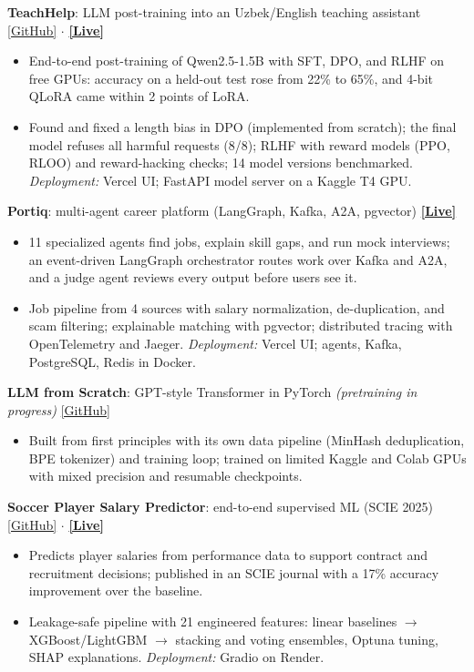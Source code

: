 \documentclass[10pt,a4paper]{article}
\newcommand{\group}[1]{\vspace{2pt}{\normalsize\bfseries\itshape #1}\par\vspace{2pt}}
\begin{document}
\textbf{TeachHelp}: LLM post-training into an Uzbek/English teaching assistant \hfill \href{https://github.com/davronbek-malikov/Post_Training}{[GitHub]} $\cdot$ \href{https://teach-help.vercel.app}{\textbf{[Live]}}
\begin{itemize}
    \item End-to-end post-training of Qwen2.5-1.5B with SFT, DPO, and RLHF on free GPUs: accuracy on a held-out test rose from 22\% to 65\%, and 4-bit QLoRA came within 2 points of LoRA.
    \item Found and fixed a length bias in DPO (implemented from scratch); the final model refuses all harmful requests (8/8); RLHF with reward models (PPO, RLOO) and reward-hacking checks; 14 model versions benchmarked. \textit{Deployment:} Vercel UI; FastAPI model server on a Kaggle T4 GPU.
\end{itemize}

\textbf{Portiq}: multi-agent career platform (LangGraph, Kafka, A2A, pgvector) \hfill \href{https://portiq-gamma.vercel.app}{\textbf{[Live]}}
\begin{itemize}
    \item 11 specialized agents find jobs, explain skill gaps, and run mock interviews; an event-driven LangGraph orchestrator routes work over Kafka and A2A, and a judge agent reviews every output before users see it.
    \item Job pipeline from 4 sources with salary normalization, de-duplication, and scam filtering; explainable matching with pgvector; distributed tracing with OpenTelemetry and Jaeger. \textit{Deployment:} Vercel UI; agents, Kafka, PostgreSQL, Redis in Docker.
\end{itemize}

\group{Machine Learning \& Deep Learning}

\textbf{LLM from Scratch}: GPT-style Transformer in PyTorch \textit{(pretraining in progress)} \hfill \href{https://github.com/davronbek-malikov/LLM_Model}{[GitHub]}
\begin{itemize}
    \item Built from first principles with its own data pipeline (MinHash deduplication, BPE tokenizer) and training loop; trained on limited Kaggle and Colab GPUs with mixed precision and resumable checkpoints.
\end{itemize}

\textbf{Soccer Player Salary Predictor}: end-to-end supervised ML (SCIE 2025) \hfill \href{https://github.com/davronbek-malikov/soccer-xG-salary_prediction}{[GitHub]} $\cdot$ \href{https://soccer-xg-salary-prediction.onrender.com}{\textbf{[Live]}}
\begin{itemize}
    \item Predicts player salaries from performance data to support contract and recruitment decisions; published in an SCIE journal with a 17\% accuracy improvement over the baseline.
    \item Leakage-safe pipeline with 21 engineered features: linear baselines $\rightarrow$ XGBoost/LightGBM $\rightarrow$ stacking and voting ensembles, Optuna tuning, SHAP explanations. \textit{Deployment:} Gradio on Render.
\end{itemize}
\end{document}
